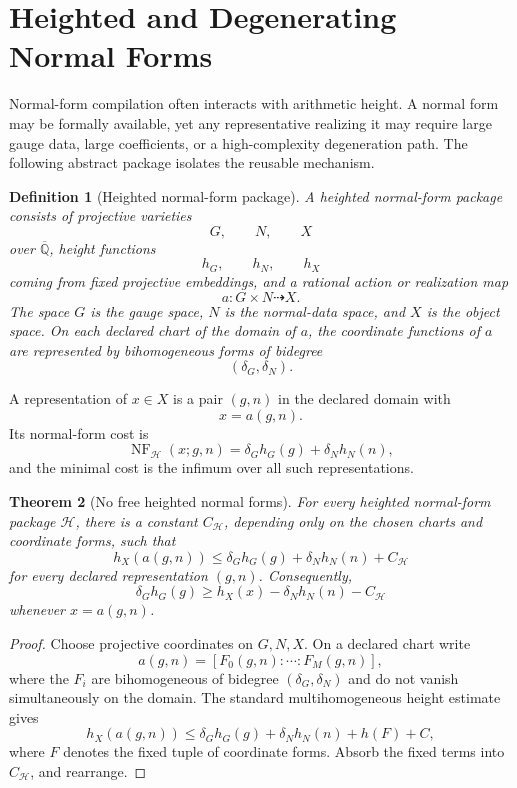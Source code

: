 \documentclass[11pt]{article}
\newtheorem{theorem}{Theorem}[section]
\newtheorem{definition}[theorem]{Definition}
\DeclareMathOperator{\NF}{NF}
\begin{document}
\section{Heighted and Degenerating Normal Forms}

Normal-form compilation often interacts with arithmetic height. A normal form may be formally available, yet any representative realizing it may require large gauge data, large coefficients, or a high-complexity degeneration path. The following abstract package isolates the reusable mechanism.

\begin{definition}[Heighted normal-form package]
A heighted normal-form package consists of projective varieties
\[
G,\qquad N,\qquad X
\]
over \(\overline{\mathbb Q}\), height functions
\[
h_G,\qquad h_N,\qquad h_X
\]
coming from fixed projective embeddings, and a rational action or realization map
\[
a:G\times N\dashrightarrow X.
\]
The space \(G\) is the gauge space, \(N\) is the normal-data space, and \(X\) is the object space. On each declared chart of the domain of \(a\), the coordinate functions of \(a\) are represented by bihomogeneous forms of bidegree
\[
(\delta_G,\delta_N).
\]
\end{definition}

A representation of \(x\in X\) is a pair \((g,n)\) in the declared domain with
\[
x=a(g,n).
\]
Its normal-form cost is
\[
\NF_{\mathcal H}(x;g,n)
=
\delta_G h_G(g)+\delta_N h_N(n),
\]
and the minimal cost is the infimum over all such representations.

\begin{theorem}[No free heighted normal forms]
For every heighted normal-form package \(\mathcal H\), there is a constant \(C_{\mathcal H}\), depending only on the chosen charts and coordinate forms, such that
\[
h_X(a(g,n))
\le
\delta_G h_G(g)+\delta_N h_N(n)+C_{\mathcal H}
\]
for every declared representation \((g,n)\). Consequently,
\[
\delta_G h_G(g)
\ge
h_X(x)-\delta_N h_N(n)-C_{\mathcal H}
\]
whenever \(x=a(g,n)\).
\end{theorem}

\begin{proof}
Choose projective coordinates on \(G,N,X\). On a declared chart write
\[
a(g,n)=[F_0(g,n):\cdots:F_M(g,n)],
\]
where the \(F_i\) are bihomogeneous of bidegree \((\delta_G,\delta_N)\) and do not vanish simultaneously on the domain. The standard multihomogeneous height estimate gives
\[
h_X(a(g,n))
\le
\delta_G h_G(g)+\delta_N h_N(n)+h(F)+C,
\]
where \(F\) denotes the fixed tuple of coordinate forms. Absorb the fixed terms into \(C_{\mathcal H}\), and rearrange.
\end{proof}
\end{document}
